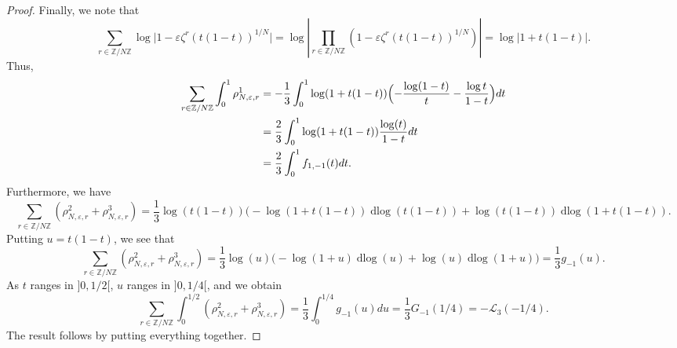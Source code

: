 \documentclass[10pt,a4paper]{amsart}
\newcommand{\Z}{\mathbb{Z}}
\newcommand{\dlog}{\operatorname{dlog}}
\newcommand{\e}{\varepsilon}
\begin{document}
\begin{proof}
Finally, we note that 
\begin{equation*}
\sum_{r\in \Z/N\Z} \log \vert 1 -\e \zeta^r (t(1-t))^{1/N} \vert = \log \left\vert \prod_{r\in \Z/N\Z} (1 -\e \zeta^r (t(1-t))^{1/N})  \right\vert  = \log \left\vert 1+t(1-t)  \right\vert.
\end{equation*}
Thus, 
\begin{align*}
\sum_{r\in \Z/N\Z} \int_0^1 \rho_{N,\e, r}^1 &= -\frac13 \int_0^1 \log (1+t(1-t)) \Bigl( -\frac{\log (1-t)}{t} - \frac{\log t}{1-t} \Bigr) dt \\ &= \frac{2}{3} \int_0^1 \log(1+t(1-t))\frac{\log(t)}{1-t} dt \\
&=\frac{2}{3} \int_0^1 f_{1,-1}(t)dt.
\end{align*}
Furthermore, we have 
\[
\sum_{r\in \Z/N\Z} (\rho_{N,\e, r}^2+\rho_{N,\e, r}^3)=\frac{1}{3} \log (t(1-t)) \bigl( -\log (1+ t(1-t)) \dlog (t(1-t)) + \log (t(1-t)) \dlog (1+ t(1-t)).
\]
Putting $u=t(1-t)$, we see that 
\[
\sum_{r\in \Z/N\Z} (\rho_{N,\e, r}^2+\rho_{N,\e, r}^3)=\frac{1}{3} \log (u) \bigl( -\log (1+ u) \dlog (u) + \log (u) \dlog (1+ u)\bigr)=\frac 13 g_{-1}(u).
\]
As $t$ ranges in $]0, 1/2[$, $u$ ranges in $]0, 1/4[$, and we obtain 
\[
\sum_{r\in \Z/N\Z} \int_0^{1/2} (\rho_{N,\e, r}^2+\rho_{N,\e, r}^3)=\frac{1}{3} \int_{0}^{1/4} g_{-1}(u) du=\frac{1}{3} G_{-1}(1/4)=-\mathcal{L}_3(-1/4).
\]
The result follows by putting everything together.
\end{proof}
\end{document}
